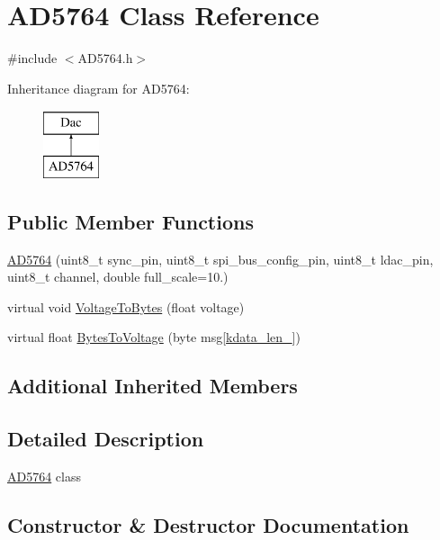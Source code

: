 \hypertarget{classAD5764}{}\section{A\+D5764 Class Reference}
\label{classAD5764}


{\ttfamily \#include $<$A\+D5764.\+h$>$}

Inheritance diagram for A\+D5764\+:\begin{figure}[H]
\begin{center}
\leavevmode
\includegraphics[height=2.000000cm]{classAD5764}
\end{center}
\end{figure}
\subsection*{Public Member Functions}
\begin{DoxyCompactItemize}
\item 
\mbox{\hyperlink{classAD5764_a391940b2f0a4f34384ae47dd3e3cc13a}{A\+D5764}} (uint8\+\_\+t sync\+\_\+pin, uint8\+\_\+t spi\+\_\+bus\+\_\+config\+\_\+pin, uint8\+\_\+t ldac\+\_\+pin, uint8\+\_\+t channel, double full\+\_\+scale=10.)
\item 
virtual void \mbox{\hyperlink{classAD5764_aae10d34276fdfcb3542e39bccd2f20f6}{Voltage\+To\+Bytes}} (float voltage)
\item 
virtual float \mbox{\hyperlink{classAD5764_a8f2845c7dd6b8984e7b85c35e50bbb66}{Bytes\+To\+Voltage}} (byte msg\mbox{[}\mbox{\hyperlink{classDac_af3de0bf669183e66ebf916f8c685fe6b}{kdata\+\_\+len\+\_\+}}\mbox{]})
\end{DoxyCompactItemize}
\subsection*{Additional Inherited Members}


\subsection{Detailed Description}
\mbox{\hyperlink{classAD5764}{A\+D5764}} class 

\subsection{Constructor \& Destructor Documentation}
\mbox{\label{classAD5764_a391940b2f0a4f34384ae47dd3e3cc13a}} 
